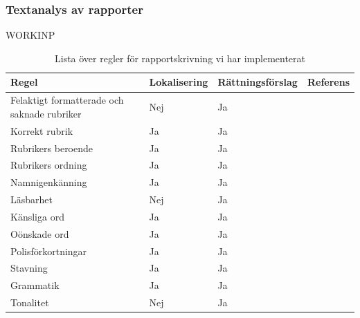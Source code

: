 \documentclass[swedish]{maucsthesis}
\begin{document}
\subsubsection{Textanalys av rapporter}
WORKINP

\begin{table}[H]
\centering
\begin{tabular}{|l|l|l|l|}
\hline
Regel                                       & Lokalisering & Rättningsförslag & Referens \\ \hline
Felaktigt formatterade och saknade rubriker & Nej          & Ja               &          \\ \hline
Korrekt rubrik                              & Ja           & Ja               &          \\ \hline
Rubrikers beroende                          & Ja           & Ja               &          \\ \hline
Rubrikers ordning                           & Ja           & Ja               &          \\ \hline
Namnigenkänning                             & Ja           & Ja               &          \\ \hline
Läsbarhet                                   & Nej          & Ja               &          \\ \hline
Känsliga ord                                & Ja           & Ja               &          \\ \hline
Oönskade ord                                & Ja           & Ja               &          \\ \hline
Polisförkortningar                          & Ja           & Ja               &          \\ \hline
Stavning                                    & Ja           & Ja               &          \\ \hline
Grammatik                                   & Ja           & Ja               &          \\ \hline
Tonalitet                                   & Nej          & Ja               &          \\ \hline
\end{tabular}
\caption{Lista över regler för rapportskrivning vi har implementerat}
\label{rulestable}
\end{table}
\end{document}
